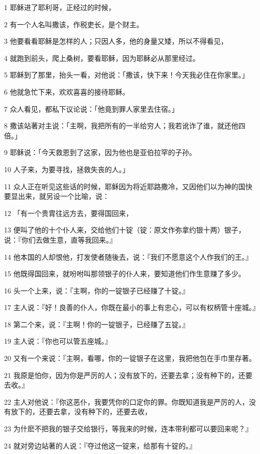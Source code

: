 \par 1 耶稣进了耶利哥，正经过的时候，
\par 2 有一个人名叫撒该，作税吏长，是个财主。
\par 3 他要看看耶稣是怎样的人；只因人多，他的身量又矮，所以不得看见，
\par 4 就跑到前头，爬上桑树，要看耶稣，因为耶稣必从那里经过。
\par 5 耶稣到了那里，抬头一看，对他说：「撒该，快下来！今天我必住在你家里。」
\par 6 他就急忙下来，欢欢喜喜的接待耶稣。
\par 7 众人看见，都私下议论说：「他竟到罪人家里去住宿。」
\par 8 撒该站著对主说：「主啊，我把所有的一半给穷人；我若讹诈了谁，就还他四倍。」
\par 9 耶稣说：「今天救恩到了这家，因为他也是亚伯拉罕的子孙。
\par 10 人子来，为要寻找，拯救失丧的人。」
\par 11 众人正在听见这些话的时候，耶稣因为将近耶路撒冷，又因他们以为神的国快要显出来，就另设一个比喻，说：
\par 12 「有一个贵胄往远方去，要得国回来，
\par 13 便叫了他的十个仆人来，交给他们十锭（锭：原文作弥拿约银十两）银子，说：『你们去做生意，直等我回来。』
\par 14 他本国的人却恨他，打发使者随後去，说：『我们不愿意这个人作我们的王。』
\par 15 他既得国回来，就吩咐叫那领银子的仆人来，要知道他们作生意赚了多少。
\par 16 头一个上来，说：『主啊，你的一锭银子已经赚了十锭。』
\par 17 主人说：『好！良善的仆人，你既在最小的事上有忠心，可以有权柄管十座城。』
\par 18 第二个来，说：『主啊！你的一锭银子，已经赚了五锭。』
\par 19 主人说：『你也可以管五座城。』
\par 20 又有一个来说：『主啊，看哪，你的一锭银子在这里，我把他包在手巾里存著。
\par 21 我原是怕你，因为你是严厉的人；没有放下的，还要去拿；没有种下的，还要去收。』
\par 22 主人对他说：『你这恶仆，我要凭你的口定你的罪。你既知道我是严厉的人，没有放下的，还要去拿，没有种下的，还要去收，
\par 23 为什麽不把我的银子交给银行，等我来的时候，连本带利都可以要回来呢？』
\par 24 就对旁边站著的人说：『夺过他这一锭来，给那有十锭的。』
